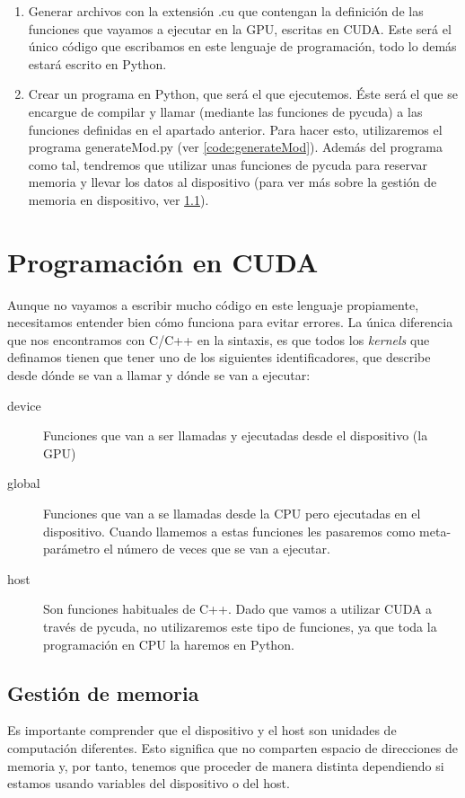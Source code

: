 \begin{enumerate}
	\item Generar archivos con la extensión .cu que contengan la definición de las funciones que vayamos a ejecutar en la \ac{GPU}, escritas en \ac{CUDA}. Este será el único código que escribamos en este lenguaje de programación, todo lo demás estará escrito en Python.
	\item Crear un programa en Python, que será el que ejecutemos. Éste será el que se encargue de compilar y llamar (mediante las funciones de pycuda) a las funciones definidas en el apartado anterior. Para hacer esto, utilizaremos el programa generateMod.py (ver \ref{code:generateMod}). Además del programa como tal, tendremos que utilizar unas funciones de pycuda para reservar memoria y llevar los datos al dispositivo (para ver más sobre la gestión de memoria en dispositivo, ver \ref{subsec:gestionDeMemoria}).
\end{enumerate}




\section{Programación en \ac{CUDA}}
Aunque no vayamos a escribir mucho código en este lenguaje propiamente, necesitamos entender bien cómo funciona para evitar errores.
La única diferencia que nos encontramos con C/C++ en la sintaxis, es que todos los \textit{kernels} que definamos tienen que tener uno de los siguientes identificadores, que describe desde dónde se van a llamar y dónde se van a ejecutar:
\begin{description}
	\item[device] Funciones que van a ser llamadas y ejecutadas desde el dispositivo (la \ac{GPU})
	\item[global] Funciones que van a se llamadas desde la \ac{CPU} pero ejecutadas en el dispositivo. Cuando llamemos a estas funciones les pasaremos como meta-parámetro el número de veces que se van a ejecutar.
	\item[host] Son funciones habituales de C++. Dado que vamos a utilizar \ac{CUDA} a través de pycuda, no utilizaremos este tipo de funciones, ya que toda la programación en \ac{CPU} la haremos en Python.
\end{description}
\subsection{Gestión de memoria}
\label{subsec:gestionDeMemoria}
Es importante comprender que el dispositivo y el host son unidades de computación diferentes. Esto significa que no comparten espacio de direcciones de memoria y, por tanto, tenemos que proceder de manera distinta dependiendo si estamos usando variables del dispositivo o del host.

